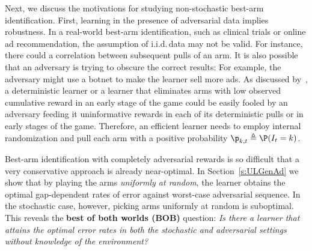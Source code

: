 Next, we discuss the motivations for studying non-stochastic best-arm identification. 
First, learning in the presence of adversarial data implies robustness. In a real-world best-arm 
identification, such as clinical trials or online ad recommendation, 
the assumption of i.i.d.\,data may not be valid. For instance, there could a 
correlation between subsequent pulls of an arm. It is also possible that an  
adversary is trying to obscure the correct results: For example, the adversary might use a 
botnet to make the learner sell more ads. %
As discussed 
by~\citet[Section~3]{Bubeck12RA},
a deterministic learner or a learner that eliminates arms with low observed cumulative reward in an early stage of the game
could be easily fooled by an 
adversary feeding it uninformative rewards in each of 
its deterministic pulls or in early stages of the game. 
Therefore, an efficient learner needs to
employ internal randomization and pull each arm with a positive probability 
$\learnerDist_{k,t}\triangleq\Pro(\pulledArm_t=k)$.

Best-arm identification with
completely adversarial rewards is so difficult that a very conservative approach is already near-optimal. In Section~\ref{s:ULGenAd} we show that by playing the arms \emph{uniformly at random}, the  
learner obtains the optimal gap-dependent rates of error 
against worst-case adversarial sequence.
In the stochastic case, however, picking arms uniformly at random is 
suboptimal. This reveals the \textbf{\textcolor{pearOne}{best of both worlds (BOB)}} 
question: \emph{Is there a learner that attains the 
	optimal error rates in both the stochastic and adversarial settings 
	without knowledge of the environment?}


